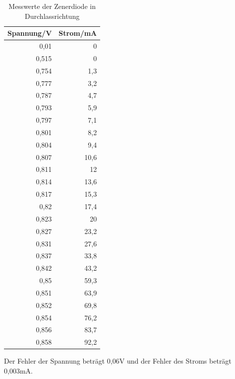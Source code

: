 \documentclass[12pt,a4paper]{article}
\begin{document}
\begin{table}[H]
\caption{Messwerte der Zenerdiode in Durchlassrichtung}
\begin{center}
\begin{tabular}{|r|r|}
\hline
\multicolumn{1}{|l|}{Spannung/V} & \multicolumn{1}{l|}{Strom/mA} \\ \hline
0,01 & 0 \\ \hline
0,515 & 0 \\ \hline
0,754 & 1,3 \\ \hline
0,777 & 3,2 \\ \hline
0,787 & 4,7 \\ \hline
0,793 & 5,9 \\ \hline
0,797 & 7,1 \\ \hline
0,801 & 8,2 \\ \hline
0,804 & 9,4 \\ \hline
0,807 & 10,6 \\ \hline
0,811 & 12 \\ \hline
0,814 & 13,6 \\ \hline
0,817 & 15,3 \\ \hline
0,82 & 17,4 \\ \hline
0,823 & 20 \\ \hline
0,827 & 23,2 \\ \hline
0,831 & 27,6 \\ \hline
0,837 & 33,8 \\ \hline
0,842 & 43,2 \\ \hline
0,85 & 59,3 \\ \hline
0,851 & 63,9 \\ \hline
0,852 & 69,8 \\ \hline
0,854 & 76,2 \\ \hline
0,856 & 83,7 \\ \hline
0,858 & 92,2 \\ \hline
\end{tabular}
\end{center}
\label{tab:a2_1}
\end{table}

Der Fehler der Spannung beträgt 0,06V und der Fehler des Stroms beträgt 0,003mA.
\end{document}
